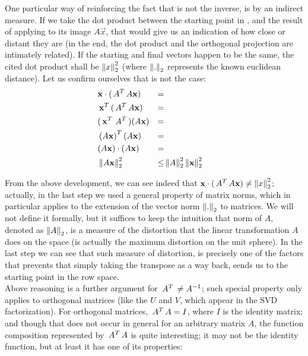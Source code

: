 One particular way of reinforcing the fact that  is not the
inverse, is by an indirect measure. If we take the dot product between
the starting point  in , and the result of applying
 to its image $A\vec{x}$, that would give us an indication of
how close or distant they are (in the end, the dot product and the
orthogonal projection are intimately related). If the starting and
final vectors happen to be the same, the cited dot product shall be
$\left\lVert x \right\rVert_2^2$ (where $\left\lVert . \right\rVert_2$ represents the known euclidean
distance). Let us confirm ourselves that is not the case: \\

\begin{align*}
& \mathbf{x} \cdot (\,{A}^{T}\, A\mathbf{x}) &= \\
& \,{\mathbf{x}}^{T}\, (\,{A}^{T}\, A\mathbf{x}) &= \\
& (\,{\mathbf{x}}^{T}\, \,{A}^{T}\,) (A\mathbf{x}) &= \\
& \,{(A\mathbf{x})}^{T}\, (A\mathbf{x}) &= \\
& (A\mathbf{x}) \cdot (A\mathbf{x}) &= \\
  & \left\lVert A\mathbf{x} \right\rVert_2^2 &\le 
& \left\lVert A \right\rVert_2^2 \left\lVert \mathbf{x} \right\rVert_2^2
\end{align*}
\hfill

From the above development, we can see indeed that $\mathbf{x}
\cdot (\,{A}^{T}\, A\mathbf{x}) \ne \left\lVert x \right\rVert_2^2$; actually, in the last step
we used a general property of matrix norms, which in particular applies
to the extension of the vector norm $\left\lVert . \right\rVert_2$ to matrices. We will not
define it formally, but it suffices to keep the intuition that norm of
$A$, denoted as $\left\lVert A \right\rVert_2$, is a measure of the distortion that the linear
transformation $A$ does on the space (is actually the maximum
distortion on the unit sphere). In the last step we can see that 
such measure of distortion, is precisely one of the factors that
prevents that simply taking the transpose  as a way back,
sends us to the starting point in the row space. \\

Above reasoning is a further argument for $\,{A}^{T}\, \ne {A}^{-1}$;
such special property only applies to orthogonal matrices (like the
$U$ and $V$, which appear in the SVD factorization). For orthogonal
matrices, $\,{A}^{T}\, A = I$, where $I$ is the identity matrix; and
though that does not occur in general for an arbitrary matrix $A$, the
function composition represented by $\,{A}^{T}\,A$ is quite interesting;
it may not be the identity function, but at least it has one of its
properties: \\

